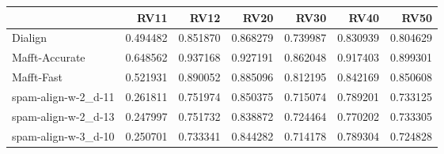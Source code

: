 \begin{tabular}{lrrrrrr}
\toprule
{} &      RV11 &      RV12 &      RV20 &      RV30 &      RV40 &      RV50 \\
\midrule
Dialign             &  0.494482 &  0.851870 &  0.868279 &  0.739987 &  0.830939 &  0.804629 \\
Mafft-Accurate      &  0.648562 &  0.937168 &  0.927191 &  0.862048 &  0.917403 &  0.899301 \\
Mafft-Fast          &  0.521931 &  0.890052 &  0.885096 &  0.812195 &  0.842169 &  0.850608 \\
spam-align-w-2\_d-11 &  0.261811 &  0.751974 &  0.850375 &  0.715074 &  0.789201 &  0.733125 \\
spam-align-w-2\_d-13 &  0.247997 &  0.751732 &  0.838872 &  0.724464 &  0.770202 &  0.733305 \\
spam-align-w-3\_d-10 &  0.250701 &  0.733341 &  0.844282 &  0.714178 &  0.789304 &  0.724828 \\
\bottomrule
\end{tabular}

